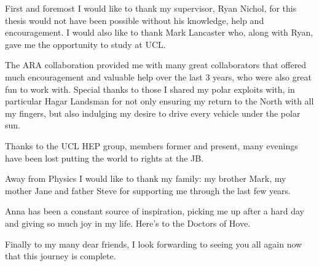 First and foremost I would like to thank my supervisor, Ryan Nichol, for this thesis would not have been possible without his knowledge, help and encouragement. I would also like to thank Mark Lancaster who, along with Ryan, gave me the opportunity to study at UCL.

The ARA collaboration provided me with many great collaborators that offered much encouragement and valuable help over the last 3 years, who were also great fun to work with. Special thanks to those I shared my polar exploits with, in particular Hagar Landsman for not only ensuring my return to the North with all my fingers, but also indulging my desire to drive every vehicle under the polar sun. 

Thanks to the UCL HEP group, members former and present,  many evenings have been lost putting the world to rights at the JB.

Away from Physics I would like to thank my family: my brother Mark, my mother Jane and father Steve for supporting me through the last few years. 

Anna has been a constant source of inspiration, picking me up after a hard day and giving so much joy in my life. Here's to the Doctors of Hove.

Finally to my many dear friends, I look forwarding to seeing you all again now that this journey is complete.



